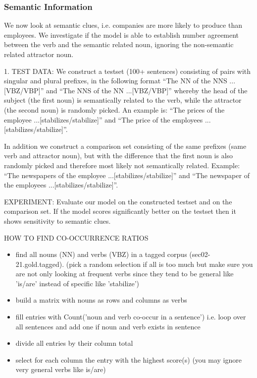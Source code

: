 \begin{multicols}{2}


\subsubsection{Semantic Information}

We now look at semantic clues, i.e. companies
are more likely to produce than employees.
We investigate if the model is able to establish
number agreement between the verb and the semantic related noun,
ignoring the non-semantic related attractor noun.
  
1. TEST DATA:
We construct a testset (100+ sentences) consisting of pairs with singular and plural prefixes, in the following format  
``The NN of the NNS ...[VBZ/VBP]'' and
``The NNS of the NN ...[VBZ/VBP]'' 
whereby the head of the subject (the first noun)
is semantically related to the verb, while the attractor (the second noun)
is randomly picked. An example is:
``The prices of the employee ...[stabilizes/stabilize]'' and 
``The price of the employees ...[stabilizes/stabilize]''.

In addition we construct a comparison set consisting of the same prefixes
(same verb and attractor noun),
but with the difference that the first noun is also randomly picked and
therefore most likely not semantically related. Example:
``The newspapers of the employee ...[stabilizes/stabilize]'' and 
``The newspaper of the employees ...[stabilizes/stabilize]''.


EXPERIMENT:
Evaluate our model on the constructed testset and on the comparison set.
If the model scores significantly better on the testset
then it shows sensitivity to semantic clues.


HOW TO FIND CO-OCCURRENCE RATIOS
\begin{itemize}
\item find all nouns (NN) and verbs (VBZ) in a tagged corpus 
(sec02-21.gold.tagged).
(pick a random selection if all is too much
but make sure you are not only looking at
frequent verbs since they tend to be general like 'is/are'
instead of specific like 'stabilize')
\item  build a matrix with nouns as rows and columns as verbs
\item  fill entries with Count('noun and verb co-occur in a sentence')
i.e. loop over all sentences and add one if noun and verb exists in sentence
\item  divide all entries by their column total
\item select for each column the entry with the highest score(s)
(you may ignore very general verbs like is/are)
\end{itemize}


\end{multicols}
